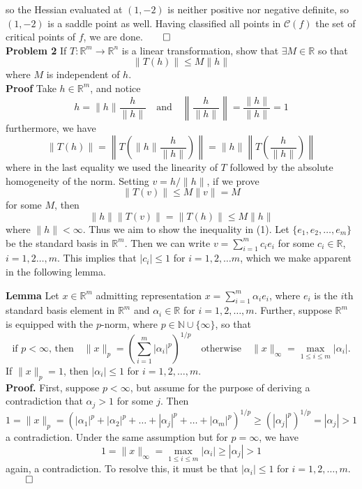 \documentclass[11pt, letterpaper]{article}
\newcommand{\mbb}[1]{\mathbb{#1}}
\newcommand{\mc}[1]{\mathcal{#1}}
\begin{document}
    so the Hessian evaluated at $(1, -2)$ is neither positive nor negative definite, so $(1, -2)$ is a saddle point as well.
    Having classified all points in $\mc{C}(f)$ the set of critical points of $f$, we are done.\hfill{$\qed$}\\[10pt]
    {\bf Problem 2} If $T:\mbb{R}^m\rightarrow\mbb{R}^n$ is a linear transformation, show that $\exists M\in\mbb{R}$ so that 
    \[\|T(h)\|\leq M\|h\|\]
    where $M$ is independent of $h$.\\[10pt]
    {\bf Proof} Take $h\in\mbb{R}^m$, and notice
    \[h=\|h\|\frac{h}{\|h\|}\quad\text{and}\quad\left\|\frac{h}{\|h\|}\right\|=\frac{\|h\|}{\|h\|}=1\] 
    furthermore, we have
    \[\|T(h)\|=\left\|T\left(\|h\|\frac{h}{\|h\|}\right)\right\|=\|h\|\left\|T\left(\frac{h}{\|h\|}\right)\right\|\]
    where in the last equality we used the linearity of $T$ followed by the absolute homogeneity of the norm. Setting $v=h/\|h\|$, if we prove
    \[\|T(v)\|\leq M\|v\|=M\tag{1}\]
    for some $M$, then
    \[\|h\|\|T(v)\|=\|T(h)\|\leq M\|h\|\]
    where $\|h\|<\infty$. Thus we aim to show the inequality in (1). Let $\{e_1,e_2,\dots,e_m\}$ be the standard basis in $\mbb{R}^m$. Then
    we can write $v=\sum_{i=1}^mc_ie_i$ for some $c_i\in\mbb{R}$, $i=1,2\dots,m$. This implies that $|c_i|\leq 1$ for $i=1,2,\dots m$, which
    we make apparent in the following lemma.
    \begin{center}
        \begin{minipage}[c]{0.85\linewidth}
            {\bf Lemma} Let $x\in\mbb{R}^m$ admitting representation $x=\sum_{i=1}^m\alpha_ie_i$, where $e_i$ is the $i$th standard basis element in $\mbb{R}^m$ and
            $\alpha_i\in\mbb{R}$ for $i=1,2,\dots,m$. Further, suppose $\mbb{R}^m$ is equipped with the $p$-norm, where $p\in\mbb{N}\cup\{\infty\}$, so that
            \[\text{if $p<\infty$, then}\quad\|x\|_p=\left(\sum_{i=1}^m|\alpha_i|^p\right)^{1/p}\quad\text{otherwise}\quad\|x\|_\infty=\max_{1\leq i\leq m}|\alpha_i|.\]
            If $\|x\|_p=1$, then $|\alpha_i|\leq 1$ for $i=1,2,\dots,m$.\\[10pt]
            {\bf Proof.} First, suppose $p<\infty$, but assume for the purpose of deriving a contradiction that $\alpha_j>1$ for some $j$. Then
            \[1=\|x\|_p=(|\alpha_1|^p+|\alpha_2|^p+\dots+|\alpha_j|^p+\dots+|\alpha_m|^p)^{1/p}\geq (|\alpha_j|^{p})^{1/p}=|\alpha_j|>1\]
            a contradiction. Under the same assumption but for $p=\infty$, we have
            \[1=\|x\|_\infty=\max_{1\leq i\leq m}|\alpha_i|\geq|\alpha_j|>1\]
            again, a contradiction. To resolve this, it must be that $|\alpha_i|\leq 1$ for $i=1,2,\dots,m$.\hfill{$\qed$}
        \end{minipage}
    \end{center}\vspace{10pt}
\end{document}
